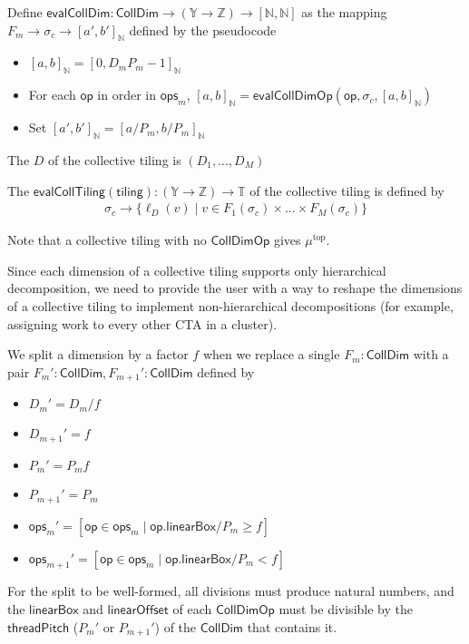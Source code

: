 \filbreak
Define $\mathsf{evalCollDim}: \mathsf{CollDim} \to (\mathbb{Y} \to \mathbb{Z}) \to [\mathbb{N}, \mathbb{N}]$
as the mapping $F_m \to \sigma_c \to [a', b']_\mathbb{N}$ defined by the pseudocode
\begin{itemize}
  \item $[a, b]_\mathbb{N} = [0, D_mP_m-1]_\mathbb{N}$
  \item For each $\mathsf{op}$ in order in $\mathsf{ops}_m$, $[a, b]_\mathbb{N} = \mathsf{evalCollDimOp}(\mathsf{op}, \sigma_c, [a, b]_\mathbb{N})$
  \item Set $[a', b']_\mathbb{N} = [a / P_m, b / P_m]_\mathbb{N}$
\end{itemize}

\filbreak
The  $D$ of the collective tiling is $(D_1, ..., D_M)$

The  $\mathsf{evalCollTiling(tiling)}: (\mathbb{Y} \to \mathbb{Z}) \to \mathbb{T}$ of the collective tiling is defined by
\begin{gather*}
  \sigma_c \to \{ \ell_D(v) \mid v \in F_1(\sigma_c) \times ... \times F_M(\sigma_c) \}
\end{gather*}

Note that a collective tiling with no $\mathsf{CollDimOp}$ gives $\mu^\text{top}$.

\filbreak
{}


Since each dimension of a collective tiling supports only hierarchical decomposition, we need to provide the user with a way to reshape the dimensions of a collective tiling to implement non-hierarchical decompositions
(for example, assigning work to every other CTA in a cluster).

\filbreak
We split a dimension by a factor $f$ when we replace a single $F_m: \mathsf{CollDim}$ with a pair $F_m': \mathsf{CollDim}, F_{m+1}': \mathsf{CollDim}$ defined by
\begin{itemize}
  \item $D_m' = D_m / f$
  \filbreak
  \item $D_{m+1}' = f$
  \filbreak
  \item $P_m' = P_m f$
  \filbreak
  \item $P_{m+1}' = P_m$
  \filbreak
  \item $\mathsf{ops}_m' = [\mathsf{op} \in \mathsf{ops}_m \mid \mathsf{op.linearBox} / P_m \ge f]$
  \filbreak
  \item $\mathsf{ops}_{m+1}' = [\mathsf{op} \in \mathsf{ops}_m \mid \mathsf{op.linearBox} / P_m < f]$
\end{itemize}
\filbreak
For the split to be well-formed, all divisions must produce natural numbers, and the $\mathsf{linearBox}$ and $\mathsf{linearOffset}$ of each $\mathsf{CollDimOp}$ must be divisible by the $\mathsf{threadPitch}$ ($P_m'$ or $P_{m+1}'$) of the $\mathsf{CollDim}$ that contains it.

